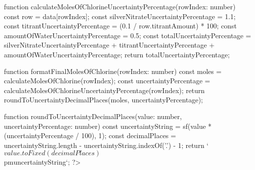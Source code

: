 \documentclass[12pt, demo]{article}
\begin{document}
function calculateMolesOfChlorineUncertaintyPercentage(rowIndex: number) {
	const row = data[rowIndex];
	const silverNitrateUncertaintyPercentage = 1.1;
	const titrantUncertaintyPercentage = (0.1 / row.titrantAmount) * 100;
	const amountOfWaterUncertaintyPercentage = 0.5;
	const totalUncertaintyPercentage =
		silverNitrateUncertaintyPercentage +
		titrantUncertaintyPercentage +
		amountOfWaterUncertaintyPercentage;
	return totalUncertaintyPercentage;
}

function formatFinalMolesOfChlorine(rowIndex: number) {
	const moles = calculateMolesOfChlorine(rowIndex);
	const uncertaintyPercentage = calculateMolesOfChlorineUncertaintyPercentage(rowIndex);
	return roundToUncertaintyDecimalPlaces(moles, uncertaintyPercentage);
}

function roundToUncertaintyDecimalPlaces(value: number, uncertaintyPercentage: number) {
	const uncertaintyString = sf(value * (uncertaintyPercentage / 100), 1);
	const decimalPlaces = uncertaintyString.length - uncertaintyString.indexOf('.') - 1;
	return `${value.toFixed(decimalPlaces)} $\\pm$ ${uncertaintyString}`;
}
?>
\end{document}
